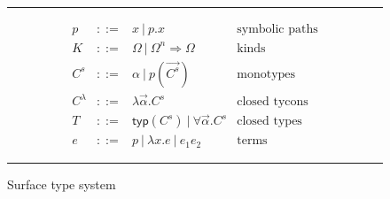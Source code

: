 \begin{figure}
\hrule

\[
\begin{array}{rcll}
p & ::= & x~|~p.x  & \textrm{symbolic paths}\\
K & ::= & \Omega~|~\Omega^n \Rightarrow \Omega & \textrm{kinds} \\
C^s & ::= & \alpha~|~p(\vec{C^s}) & \textrm{monotypes}\\
C^\lambda & ::= & \lambda\vec{\alpha}.C^s & \textrm{closed tycons}\\
T & ::= &
\mathsf{typ}(C^s)~|~\forall\vec{\alpha}.C^s & \textrm{closed types} \\
e & ::= & p~|~\lambda x.e~|~e_1 e_2 & \textrm{terms}
\end{array}
\]

\hrule
\caption{Surface type system}
\label{fig:typesystem}
\end{figure}
